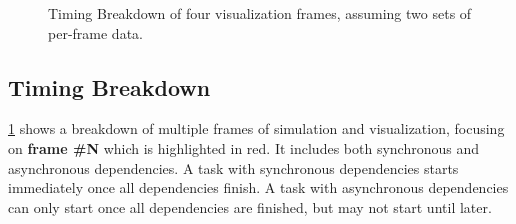 \begin{figurepage}
\begin{figure}[p]
    \centering
    \caption{Timing Breakdown of four visualization frames, assuming two sets of per-frame data.}
    \label{fig:DesignTiming}
\end{figure}
\end{figurepage}

\subsection{Timing Breakdown}\label{sec:Design:Viz:Timing}

\cref{fig:DesignTiming} shows a breakdown of multiple frames of simulation and visualization, focusing on \textbf{frame \#N} which is highlighted in red.
It includes both synchronous and asynchronous dependencies.
A task with synchronous dependencies starts immediately once all dependencies finish.
A task with asynchronous dependencies can only start once all dependencies are finished, but may not start until later.

